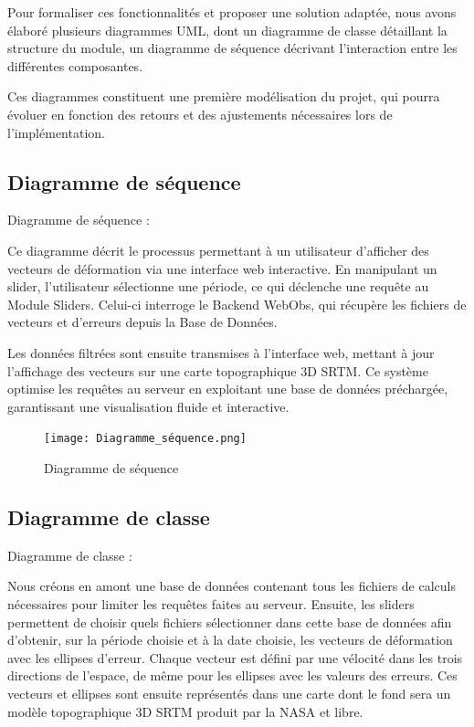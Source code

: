 \documentclass[11pt]{article}
\begin{document}
Pour formaliser ces fonctionnalités et proposer une solution adaptée, nous avons élaboré plusieurs diagrammes UML, dont un diagramme de classe détaillant la structure du module, un diagramme de séquence décrivant l'interaction entre les différentes composantes.

Ces diagrammes constituent une première modélisation du projet, qui pourra évoluer en fonction des retours et des ajustements nécessaires lors de l’implémentation.

\subsection{Diagramme de séquence}
\vspace{0,1cm}
Diagramme de séquence :

Ce diagramme décrit le processus permettant à un utilisateur d’afficher des vecteurs de déformation via une interface web interactive. En manipulant un slider, l’utilisateur sélectionne une période, ce qui déclenche une requête au Module Sliders. Celui-ci interroge le Backend WebObs, qui récupère les fichiers de vecteurs et d’erreurs depuis la Base de Données.

Les données filtrées sont ensuite transmises à l’interface web, mettant à jour l’affichage des vecteurs sur une carte topographique 3D SRTM. Ce système optimise les requêtes au serveur en exploitant une base de données préchargée, garantissant une visualisation fluide et interactive.

\begin{figure}[h!]
    \centering 
    \texttt{[image: Diagramme\_séquence.png]} 
    \caption{Diagramme de séquence} 
\end{figure}

\newpage
\subsection{Diagramme de classe}
\vspace{0,1cm}
Diagramme de classe :

Nous créons en amont une base de données contenant tous les fichiers de calculs nécessaires pour limiter les requêtes faites au serveur. Ensuite, les sliders permettent de choisir quels fichiers sélectionner dans cette base de données afin d’obtenir, sur la période choisie et à la date choisie, les vecteurs de déformation avec les ellipses d’erreur. Chaque vecteur est défini par une vélocité dans les trois directions de l’espace, de même pour les ellipses avec les valeurs des erreurs. Ces vecteurs et ellipses sont ensuite représentés dans une carte dont le fond sera un modèle topographique 3D SRTM produit par la NASA et libre.
\end{document}
